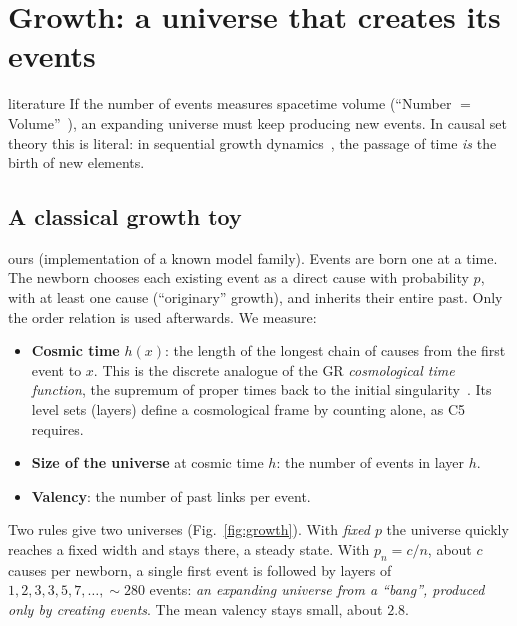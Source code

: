 \documentclass[11pt,a4paper]{article}
\newcommand{\tagbox}[2]{\textsf{\scriptsize\colorbox{#1!12}{\textcolor{#1!70!black}{#2}}}}
\newcommand{\lit}{\tagbox{blue}{literature}}
\newcommand{\ours}{\tagbox{orange}{ours}}
\begin{document}
\section{Growth: a universe that creates its events}
\lit{} If the number of events measures spacetime volume (``Number $=$ Volume''~\cite{Surya19}), an expanding universe must keep producing new events. In causal set theory this is literal: in sequential growth dynamics~\cite{RideoutSorkin00}, the passage of time \emph{is} the birth of new elements.

\subsection{A classical growth toy}
\ours{} (implementation of a known model family). Events are born one at a time. The newborn chooses each existing event as a direct cause with probability $p$, with at least one cause (``originary'' growth), and inherits their entire past. Only the order relation is used afterwards. We measure:
\begin{itemize}[leftmargin=*,itemsep=1pt]
\item \textbf{Cosmic time} $h(x)$: the length of the longest chain of causes from the first event to $x$. This is the discrete analogue of the GR \emph{cosmological time function}, the supremum of proper times back to the initial singularity~\cite{AGH98}. Its level sets (layers) define a cosmological frame by counting alone, as C5 requires.
\item \textbf{Size of the universe} at cosmic time $h$: the number of events in layer $h$.
\item \textbf{Valency}: the number of past links per event.
\end{itemize}
Two rules give two universes (Fig.~\ref{fig:growth}). With \emph{fixed $p$} the universe quickly reaches a fixed width and stays there, a steady state. With $p_n=c/n$, about $c$ causes per newborn, a single first event is followed by layers of $1,2,3,3,5,7,\dots,\sim280$ events: \emph{an expanding universe from a ``bang'', produced only by creating events}. The mean valency stays small, about $2.8$.
\end{document}
